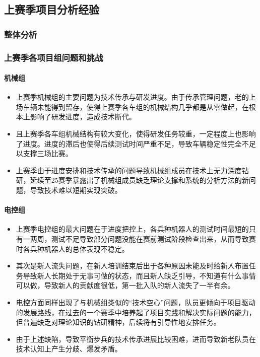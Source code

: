 \subsection{上赛季项目分析经验}

    \subsubsection{整体分析}

    \subsubsection{上赛季各项目组问题和挑战}

        \paragraph{机械组}


            \begin{itemize}
                \item 上赛季机械组的主要问题为技术传承与研发进度。由于传承管理问题，老的上场车辆未能得到留存，使得上赛季各车组的机械结构几乎都是从零做起，在根本上影响了研发进度，造成技术断代。
                \item 且上赛季各车组机械结构有较大变化，使得研发任务较重，一定程度上也影响了进度。进度的滞后也使得后续测试时间严重不足，导致车辆稳定性完全不足以支撑三场比赛。
                \item 上赛季由于进度安排和技术传承的问题导致机械组成员在技术上无力深度钻研，延续至25赛季暴露出了机械组成员缺乏理论支撑和系统的分析方法的新问题，导致技术难以短期实现突破。
            \end{itemize}

        \paragraph{电控组}


            \begin{itemize}
                \item 上赛季电控组的最大问题在于进度把控上，各兵种机器人的测试时间最短的只有一两周，测试不足导致部分问题没能在赛前测试阶段检查出来，从而导致赛时各兵种机器人的总体表现不稳定。
                \item 其次是新人流失问题，在新人培训结束后出于各种原因未能及时给新人布置任务导致新人长期处于无事可做的状态，而且新人缺乏引导，不知道有什么事情可以做，导致新人的贡献度很低，第一批入队的新人流失了一半有余。
                \item 电控方面同样出现了与机械组类似的“技术空心”问题，队员更倾向于项目驱动的发展路线，在过去的一个赛季中培养起了项目实践和解决实际问题的能力，但普遍缺乏对理论知识的钻研精神，后续将有引导性地安排任务。
                \item 由于上述缺陷，导致平衡步兵的技术传承进展比较困难，进而导致新老队员在技术认知上产生分歧、爆发矛盾。
            \end{itemize}

